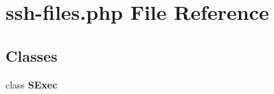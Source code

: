 \section{ssh-files.php File Reference}
\label{ssh-files_8php}
\subsection*{Classes}
\begin{CompactItemize}
\item 
class {\bf SExec}
\end{CompactItemize}
